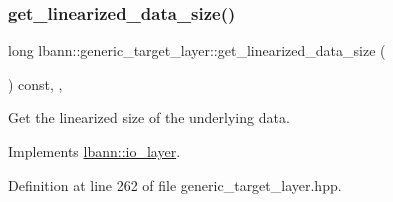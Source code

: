 \subsubsection{\texorpdfstring{get\+\_\+linearized\+\_\+data\+\_\+size()}{get\_linearized\_data\_size()}}
{\footnotesize\ttfamily long lbann\+::generic\+\_\+target\+\_\+layer\+::get\+\_\+linearized\+\_\+data\+\_\+size (\begin{DoxyParamCaption}{ }\end{DoxyParamCaption}) const\hspace{0.3cm}{\ttfamily [inline]}, {\ttfamily [override]}, {\ttfamily [virtual]}}

Get the linearized size of the underlying data. 

Implements \hyperlink{classlbann_1_1io__layer_ab061ec74d131699c7fd59b992bbe7036}{lbann\+::io\+\_\+layer}.



Definition at line 262 of file generic\+\_\+target\+\_\+layer.\+hpp.


